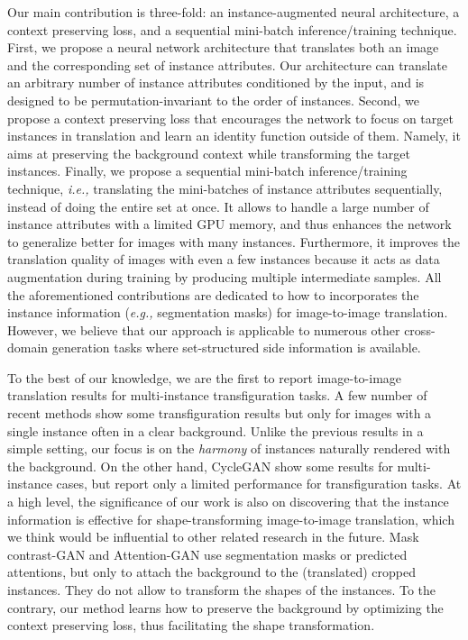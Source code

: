 \documentclass{article} \usepackage{iclr2019_conference,times}
\begin{document}
Our main contribution is three-fold: an instance-augmented neural  architecture, a context preserving loss,
and a sequential mini-batch inference/training technique. First, we propose a neural network architecture that  translates both an image and the corresponding set of instance attributes. Our architecture can translate an arbitrary number of instance attributes conditioned by the input,
and is designed to be permutation-invariant to the order of instances.
Second, we propose a context preserving loss that 
encourages the network to focus on target instances in translation and learn an identity function outside of them. Namely, it aims at preserving the background context while transforming the target instances.
Finally, we propose a sequential mini-batch inference/training technique,
\textit{i.e.,} translating the mini-batches of instance attributes sequentially, instead of doing the entire set at once.
It allows to handle a large number of instance attributes with a limited GPU memory,
and thus enhances the network to generalize better for images with many instances.
Furthermore, it improves the translation quality of images with even a few instances because it acts as data augmentation during training by producing  multiple intermediate samples. All the aforementioned contributions are dedicated to how to
incorporates the instance information (\textit{e.g.,} segmentation masks) for image-to-image translation.
However, we believe that our approach is applicable to numerous other cross-domain generation tasks where set-structured side information is available.



To the best of our knowledge, 
we are the first to report image-to-image translation results for multi-instance transfiguration tasks.
A few number of recent methods  \citep{kim2017learning, liu2017unsupervised, gokaslan2018improving} show some transfiguration results but only for images with a single instance often in a clear background. 
Unlike the previous results in a simple setting, our focus is on the \textit{harmony} of instances naturally rendered with the background.
On the other hand, CycleGAN \citep{zhu2017unpaired} show
some results for multi-instance cases,
but report only a limited performance for transfiguration tasks. At a high level, the significance of our work is also on 
discovering that the instance information is effective for shape-transforming image-to-image translation, which we think would be influential to other related research in the future.
Mask contrast-GAN \citep{liang2017generative} and
Attention-GAN \citep{mejjati2018unsupervised} use segmentation masks or predicted attentions,
but only to attach the background to the (translated) cropped instances. They do not allow to transform the shapes of the instances.
To the contrary, our method learns how to preserve the background by optimizing 
the context preserving loss, thus facilitating the shape transformation.
\end{document}
